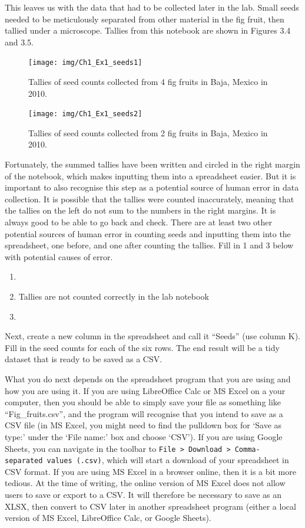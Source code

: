 \documentclass[
]{scrbook}
\providecommand{\tightlist}{%
  \setlength{\itemsep}{0pt}\setlength{\parskip}{0pt}}
\begin{document}
This leaves us with the data that had to be collected later in the lab.
Small seeds needed to be meticulously separated from other material in the fig fruit, then tallied under a microscope. Tallies from this notebook are shown in Figures 3.4 and 3.5.

\begin{figure}
\texttt{[image: img/Ch1\_Ex1\_seeds1]} \caption{Tallies of seed counts collected from 4 fig fruits in Baja, Mexico in 2010.}\label{fig:unnamed-chunk-13}
\end{figure}

\begin{figure}
\texttt{[image: img/Ch1\_Ex1\_seeds2]} \caption{Tallies of seed counts collected from 2 fig fruits in Baja, Mexico in 2010.}\label{fig:unnamed-chunk-14}
\end{figure}

Fortunately, the summed tallies have been written and circled in the right margin of the notebook, which makes inputting them into a spreadsheet easier.
But it is important to also recognise this step as a potential source of human error in data collection.
It is possible that the tallies were counted inaccurately, meaning that the tallies on the left do not sum to the numbers in the right margins.
It is always good to be able to go back and check.
There are at least two other potential sources of human error in counting seeds and inputting them into the spreadsheet, one before, and one after counting the tallies.
Fill in 1 and 3 below with potential causes of error.

\begin{enumerate}
\def\labelenumi{\arabic{enumi}.}
\tightlist
\item
\item
  Tallies are not counted correctly in the lab notebook
\item
\end{enumerate}

Next, create a new column in the spreadsheet and call it ``Seeds'' (use column K).
Fill in the seed counts for each of the six rows.
The end result will be a tidy dataset that is ready to be saved as a CSV.

What you do next depends on the spreadsheet program that you are using and how you are using it.
If you are using LibreOffice Calc or MS Excel on a your computer, then you should be able to simply save your file as something like ``Fig\_fruits.csv'', and the program will recognise that you intend to save as a CSV file (in MS Excel, you might need to find the pulldown box for `Save as type:' under the `File name:' box and choose `CSV').
If you are using Google Sheets, you can navigate in the toolbar to \texttt{File\ \textgreater{}\ Download\ \textgreater{}\ Comma-separated\ values\ (.csv)}, which will start a download of your spreadsheet in CSV format.
If you are using MS Excel in a browser online, then it is a bit more tedious.
At the time of writing, the online version of MS Excel does not allow users to save or export to a CSV.
It will therefore be necessary to save as an XLSX, then convert to CSV later in another spreadsheet program (either a local version of MS Excel, LibreOffice Calc, or Google Sheets).
\end{document}
